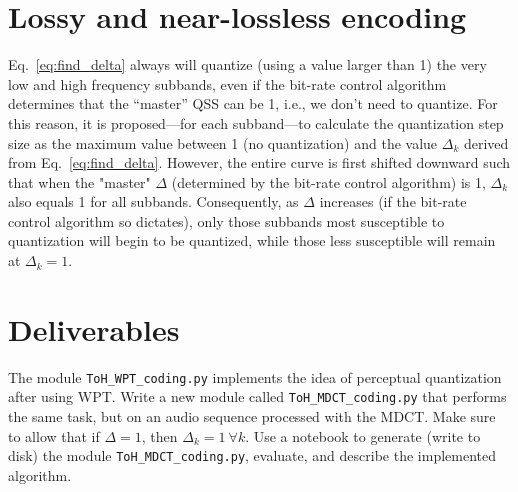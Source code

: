 
\section{Lossy and near-lossless encoding}
Eq.~\eqref{eq:find_delta} always will quantize (using a value larger
than 1) the very low and high frequency subbands, even if the bit-rate
control algorithm determines that the ``master'' QSS can be 1, i.e.,
we don't need to quantize. For this reason, it is proposed—for each
subband—to calculate the quantization step size as the maximum value
between 1 (no quantization) and the value $\Delta_k$ derived from
Eq.~\eqref{eq:find_delta}. However, the entire curve is first shifted
downward such that when the "master" $\Delta$ (determined by the
bit-rate control algorithm) is 1, $\Delta_k$ also equals 1 for all
subbands. Consequently, as $\Delta$ increases (if the bit-rate control
algorithm so dictates), only those subbands most susceptible to
quantization will begin to be quantized, while those less susceptible
will remain at $\Delta_k = 1$.

\section{Deliverables}

The module \verb|ToH_WPT_coding.py| implements the idea of perceptual
quantization after using WPT. Write a new module called
\verb|ToH_MDCT_coding.py| that performs the same task, but on an audio
sequence processed with the MDCT. Make sure to allow that if $\Delta=1$,
then $\Delta_k=1~\forall k$. Use a notebook to generate (write to
disk) the module \verb|ToH_MDCT_coding.py|, evaluate, and describe the
implemented algorithm.


